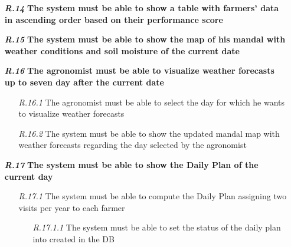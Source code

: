 \begin{itemize}
\item [\textbf{\textit{R.14}}] \textbf{The system must be able to show a table with farmers' data in ascending order based on their performance score}
\item [\textbf{\textit{R.15}}] \textbf{The system must be able to show the map of his mandal with weather conditions and soil moisture of the current date}
\item [\textbf{\textit{R.16}}] \textbf{The agronomist must be able to visualize weather forecasts up to seven day after the current date}
        \begin{itemize}
            \item [\textit{R.16.1}] The agronomist must be able to select the day for which he wants to visualize weather forecasts
	        \item [\textit{R.16.2}] The system must be able to show the updated mandal map with weather forecasts regarding the day selected by the agronomist
        \end{itemize}
        \item [\textbf{\textit{R.17}}] \textbf{The system must be able to show the Daily Plan of the current day}
        \begin{itemize}
            \item [\textit{R.17.1}] The system must be able to compute the Daily Plan assigning two visits per year to each farmer
            \begin{itemize}
                \item [\textit{R.17.1.1}] The system must be able to set the status of the daily plan into created in the DB
            \end{itemize}
        \end{itemize}
		


\end{itemize}
